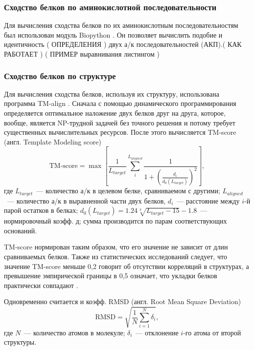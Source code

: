 \documentclass[a4paper,14pt]{article}         %
\newcommand{\sic}[1]{\LARGE\color{orange}{#1}\color{black}\Large}
\begin{document}
\subsubsection{Сходство белков по аминокислотной последовательности}
Для вычисления сходства белков по их аминокислотным последовательностям был использован модуль Biopython \cite{biopython}. Он позволяет вычислить подобие и идентичность (\color{orange} ОПРЕДЕЛЕНИЯ \color{black}) двух а/к последовательностей (АКП).(\color{orange} КАК РАБОТАЕТ \color{black}) (\color{orange} ПРИМЕР выравнивания листингом \color{black}) 

\subsubsection{Сходство белков по структуре} \label{TM principle}
Для вычисления сходства белков, используя их структуру, использована программа TM-align \cite{TM, TMalign}. \sic{почему он хорош?}
Сначала с помощью динамического программирования определяется оптимальное наложение двух белков друг на друга, которое, вообще, является NP-трудной задачей без точного решения \cite{Lathrop1994} 
и потому требует существенных вычислительных ресурсов. После этого вычисляется TM-score (англ. Template Modeling score)\cite{Levitt1998} 
\begin{equation}
\label{tm-score}
\text{TM-score} = \max\left[\frac{1}{L_{target}}\sum_i^{L_{aligned}}\frac{1}{1+\left(\frac{d_i}{d_0(L_{target})}\right)^2}\right],
\end{equation}
где $L_{target}$~--- количество а/к в целевом белке, сравниваемом с другими; $L_{aligned}$~--- количество а/к в выравненной части двух белков, $d_i$~--- расстояние между $i$-й парой остатков в белках; $d_0(L_{target}) = 1.24\sqrt[3]{L_{target}-15}-1.8$~--- нормировочный коэфф. д; сумма производится по парам соответствующих оснований. 

TM-score нормирован таким образом, что его значение не зависит от длин сравниваемых белков. Также из статистических исследований следует, что значение TM-score меньше 0,2 говорит об отсутствии корреляций в структурах, а превышение эмпирической границы в 0,5 означает, что укладки белков практически совпадают \cite{TMalign, Xu2010}. 

Одновременно считается и коэфф. RMSD (англ. Root Mean Square Deviation) %
\begin{equation}
\label{rmsd}
\text{RMSD} = \sqrt{\frac{1}{N}\sum_{i=1}^N \delta_i},
\end{equation}
где $N$~--- количество атомов в молекуле; $\delta_i$~--- отклонение $i$-го атома от второй структуры.
\end{document}

